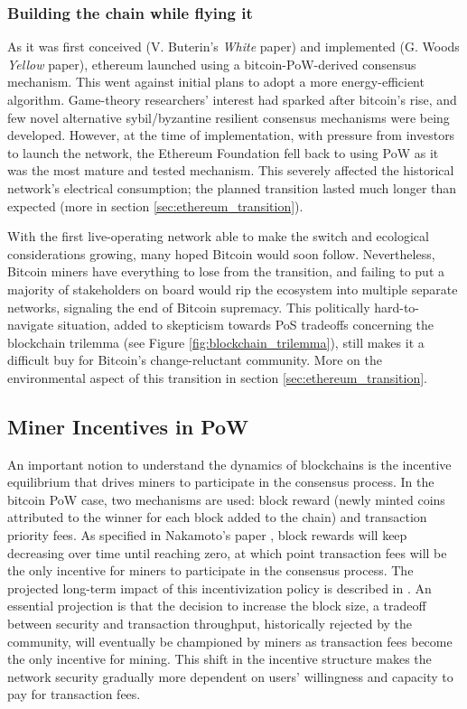 \documentclass[11pt]{report}
\begin{document}
\subsubsection{Building the chain while flying it}
As it was first conceived (V. Buterin's \textit{White} paper) \cite{buterinEthereumNextgenerationSmart} and implemented (G. Woods \textit{Yellow} paper)\cite{woodEthereumSecuredDecentralised2023}, ethereum launched using a bitcoin-PoW-derived consensus mechanism. This went against initial plans to adopt a more energy-efficient algorithm. Game-theory researchers' interest had sparked after bitcoin's rise, and few novel alternative sybil/byzantine resilient consensus mechanisms were being developed. However, at the time of implementation, with pressure from investors to launch the network, the Ethereum Foundation fell back to using PoW as it was the most mature and tested mechanism. This severely affected the historical network's electrical consumption; the planned transition lasted much longer than expected (more in section \ref{sec:ethereum_transition}).

With the first live-operating network able to make the switch and ecological considerations growing, many hoped Bitcoin would soon follow.  Nevertheless, Bitcoin miners have everything to lose from the transition, and failing to put a majority of stakeholders on board would rip the ecosystem into multiple separate networks, signaling the end of Bitcoin supremacy. This politically hard-to-navigate situation, added to skepticism towards PoS tradeoffs concerning the blockchain trilemma (see Figure \ref{fig:blockchain_trilemma}), still makes it a difficult buy for Bitcoin's change-reluctant community. More on the environmental aspect of this transition in section \ref{sec:ethereum_transition}.

\subsection{Miner Incentives in \ac{PoW}}

An important notion to understand the dynamics of blockchains is the incentive equilibrium that drives miners to participate in the consensus process. In the bitcoin \ac{PoW} case, two mechanisms are used: block reward (newly minted coins attributed to the winner for each block added to the chain) and transaction priority fees. As specified in Nakamoto's paper \cite{nakamotoBitcoinPeertopeerElectronic2008}, block rewards will keep decreasing over time until reaching zero, at which point transaction fees will be the only incentive for miners to participate in the consensus process. The projected long-term impact of this incentivization policy is described in \cite{easleyMiningMarketsEvolution2019}. An essential projection is that the decision to increase the block size, a tradeoff between security and transaction throughput, historically rejected by the community, will eventually be championed by miners as transaction fees become the only incentive for mining. This shift in the incentive structure makes the network security gradually more dependent on users' willingness and capacity to pay for transaction fees.
\end{document}
